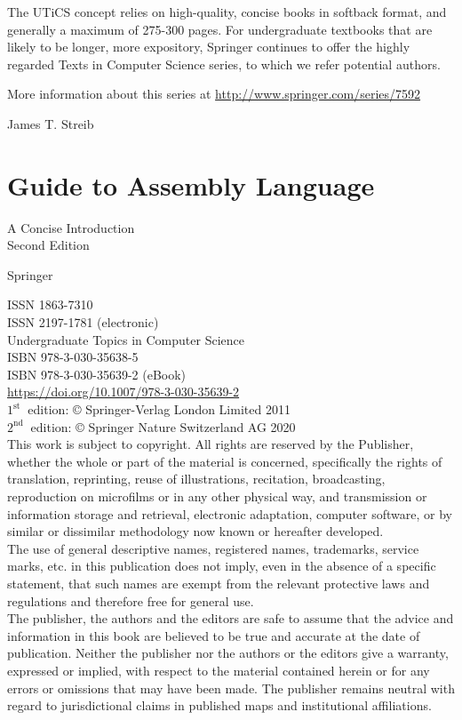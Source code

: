 \documentclass[10pt]{article}
\begin{document}
The UTiCS concept relies on high-quality, concise books in softback format, and generally a maximum of 275-300 pages. For undergraduate textbooks that are likely to be longer, more expository, Springer continues to offer the highly regarded Texts in Computer Science series, to which we refer potential authors.

More information about this series at \href{http://www.springer.com/series/7592}
{http://www.springer.com/series/7592}

James T. Streib

\section*{Guide to Assembly Language }
A Concise Introduction\\
Second Edition

Springer

ISSN 1863-7310\\
ISSN 2197-1781 (electronic)\\
Undergraduate Topics in Computer Science\\
ISBN 978-3-030-35638-5\\
ISBN 978-3-030-35639-2 (eBook)\\
\href{https://doi.org/10.1007/978-3-030-35639-2}{https://doi.org/10.1007/978-3-030-35639-2}\\
$1^{\text {st }}$ edition: © Springer-Verlag London Limited 2011\\
$2^{\text {nd }}$ edition: © Springer Nature Switzerland AG 2020\\
This work is subject to copyright. All rights are reserved by the Publisher, whether the whole or part of the material is concerned, specifically the rights of translation, reprinting, reuse of illustrations, recitation, broadcasting, reproduction on microfilms or in any other physical way, and transmission or information storage and retrieval, electronic adaptation, computer software, or by similar or dissimilar methodology now known or hereafter developed.\\
The use of general descriptive names, registered names, trademarks, service marks, etc. in this publication does not imply, even in the absence of a specific statement, that such names are exempt from the relevant protective laws and regulations and therefore free for general use.\\
The publisher, the authors and the editors are safe to assume that the advice and information in this book are believed to be true and accurate at the date of publication. Neither the publisher nor the authors or the editors give a warranty, expressed or implied, with respect to the material contained herein or for any errors or omissions that may have been made. The publisher remains neutral with regard to jurisdictional claims in published maps and institutional affiliations.
\end{document}
